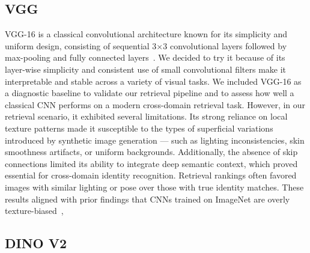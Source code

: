 \subsection{VGG}

VGG-16 is a classical convolutional architecture known for its simplicity and uniform design, consisting of sequential 3×3 convolutional layers followed by max-pooling and fully connected layers~\cite{simonyan2015very}.
We decided to try it because of its layer-wise simplicity and consistent use of small convolutional filters make it interpretable and stable across a variety of visual tasks.
We included VGG-16 as a diagnostic baseline to validate our retrieval pipeline and to assess how well a classical CNN performs on a modern cross-domain retrieval task.
However, in our retrieval scenario, it exhibited several limitations. Its strong reliance on local texture patterns made it susceptible to the types of superficial variations introduced by synthetic image generation — such as lighting inconsistencies, skin smoothness artifacts, or uniform backgrounds.
Additionally, the absence of skip connections limited its ability to integrate deep semantic context, which proved essential for cross-domain identity recognition.
Retrieval rankings often favored images with similar lighting or pose over those with true identity matches. These results aligned with prior findings that CNNs trained on ImageNet are overly texture-biased~\cite{geirhos2019imagenet},

\subsection{DINO V2}

